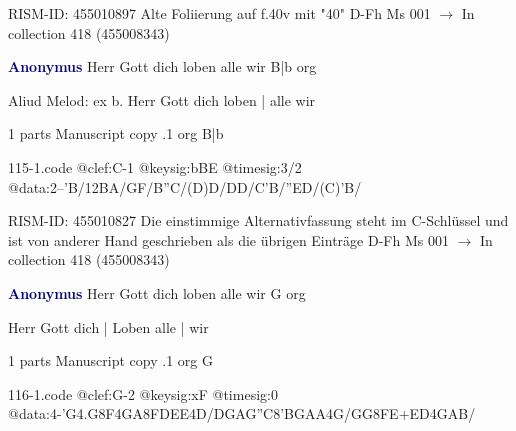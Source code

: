 \documentclass[twocolumn]{book}
\begin{document}
\newline RISM-ID: 455010897
\newline Alte Foliierung auf f.40v mit "40"
\newline D-Fh  Ms 001
\newline $\rightarrow$ In collection 418 (455008343)

\newline \par \vspace{7pt} \textcolor{darkblue}{\textbf{Anonymus  }}
\newline Herr Gott dich loben alle wir  B|b  
\newline org
\newline \begin{itshape} Aliud Melod: ex b. Herr Gott dich loben | alle wir\end{itshape} 
\newline \textcolor{darkblue}{}  1 parts  
\newline Manuscript copy
.1  org  B|b  
\begin{filecontents*}{115-1.code}
@clef:C-1
@keysig:bBE
@timesig:3/2
@data:2--'B/12BA/GF/B''C/(D)D/DD/C'B/''ED/(C)'B/
\end{filecontents*}
\newline
%

\newline RISM-ID: 455010827
\newline Die einstimmige Alternativfassung steht im C-Schlüssel und ist von anderer Hand geschrieben als die übrigen Einträge
\newline D-Fh  Ms 001
\newline $\rightarrow$ In collection 418 (455008343)

\newline \par \vspace{7pt} \textcolor{darkblue}{\textbf{Anonymus  }}
\newline Herr Gott dich loben alle wir  G  
\newline org
\newline \begin{itshape}[f.15r, at left:] Herr Gott dich | Loben alle | wir\end{itshape} 
\newline \textcolor{darkblue}{}  1 parts  
\newline Manuscript copy
.1  org  G  
\begin{filecontents*}{116-1.code}
@clef:G-2
@keysig:xF
@timesig:0
@data:4-'G4.G8F4GA{8FDEE}4D/DGAG''C{8'BGAA}4G/GG{8FE+}{ED}4GAB/
\end{filecontents*}
\newline
%
\end{document}
